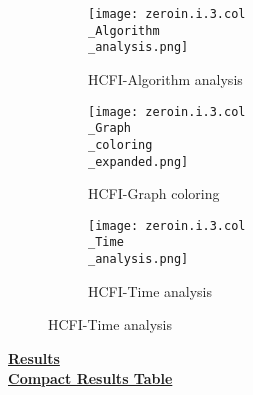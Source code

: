 \documentclass[10pt]{article}
\begin{document}
\graphicspath{{./Core1/Solutions/HCFI/zeroin.i.3.col}}
\begin{figure}[H]
\begin{subfigure}{.33\textwidth}
  \centering
  \texttt{[image: zeroin.i.3.col\\\_Algorithm\\\_analysis.png]}
  \caption{HCFI-Algorithm analysis}
   \label{fig:subfig1}
\end{subfigure}%
\begin{subfigure}{.33\textwidth}
  \centering
  \texttt{[image: zeroin.i.3.col\\\_Graph\\\_coloring\\\_expanded.png]}
  \caption{HCFI-Graph coloring}
  \label{fig:subfig2}
\end{subfigure}
\begin{subfigure}{.33\textwidth}
  \centering
  \texttt{[image: zeroin.i.3.col\\\_Time\\\_analysis.png]}
  \caption{HCFI-Time analysis}
  \end{subfigure}
\end{figure}
\vspace{2cm}
\begin{center}
\hyperlink{page.8}{\textbf{Results}}\\
\vspace{0.5cm}
\hyperlink{page.71}{\textbf{Compact Results Table}}
\end{center}
\pagebreak%
\end{document}
